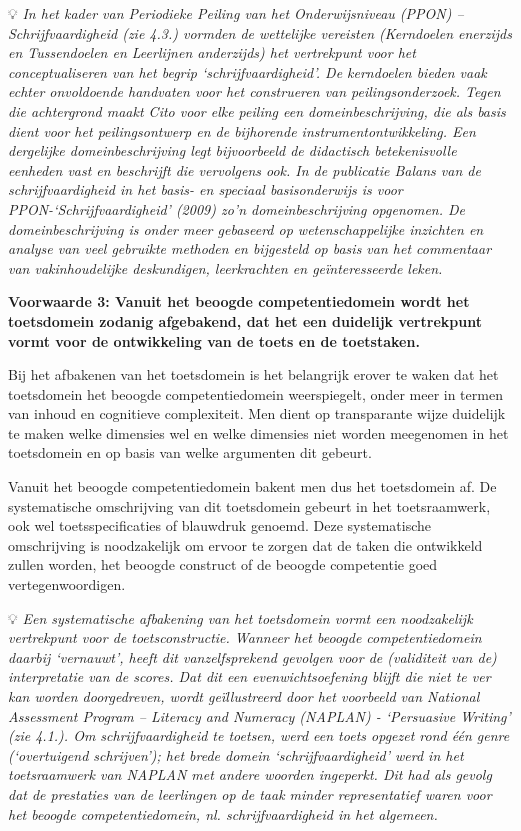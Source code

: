\documentclass[
  letterpaper,
]{report}
\begin{document}
💡 \emph{In het kader van Periodieke Peiling van het Onderwijsniveau
(PPON) -- Schrijfvaardigheid (zie 4.3.) vormden de wettelijke vereisten
(Kerndoelen enerzijds en Tussendoelen en Leerlijnen anderzijds) het
vertrekpunt voor het conceptualiseren van het begrip
`schrijfvaardigheid'. De kerndoelen bieden vaak echter onvoldoende
handvaten voor het construeren van peilingsonderzoek. Tegen die
achtergrond maakt Cito voor elke peiling een domeinbeschrijving, die als
basis dient voor het peilingsontwerp en de bijhorende
instrumentontwikkeling. Een dergelijke domeinbeschrijving legt
bijvoorbeeld de didactisch betekenisvolle eenheden vast en beschrijft
die vervolgens ook. In de publicatie Balans van de schrijfvaardigheid in
het basis- en speciaal basisonderwijs is voor PPON-`Schrijfvaardigheid'
(2009) zo'n domeinbeschrijving opgenomen. De domeinbeschrijving is onder
meer gebaseerd op wetenschappelijke inzichten en analyse van veel
gebruikte methoden en bijgesteld op basis van het commentaar van
vakinhoudelijke deskundigen, leerkrachten en geïnteresseerde leken.}

\textbf{Voorwaarde 3: Vanuit het beoogde competentiedomein wordt het
toetsdomein zodanig afgebakend, dat het een duidelijk vertrekpunt vormt
voor de ontwikkeling van de toets en de toetstaken.}

Bij het afbakenen van het toetsdomein is het belangrijk erover te waken
dat het toetsdomein het beoogde competentiedomein weerspiegelt, onder
meer in termen van inhoud en cognitieve complexiteit. Men dient op
transparante wijze duidelijk te maken welke dimensies wel en welke
dimensies niet worden meegenomen in het toetsdomein en op basis van
welke argumenten dit gebeurt.

Vanuit het beoogde competentiedomein bakent men dus het toetsdomein af.
De systematische omschrijving van dit toetsdomein gebeurt in het
toetsraamwerk, ook wel toetsspecificaties of blauwdruk genoemd. Deze
systematische omschrijving is noodzakelijk om ervoor te zorgen dat de
taken die ontwikkeld zullen worden, het beoogde construct of de beoogde
competentie goed vertegenwoordigen.

💡 \emph{Een systematische afbakening van het toetsdomein vormt een
noodzakelijk vertrekpunt voor de toetsconstructie. Wanneer het beoogde
competentiedomein daarbij `vernauwt', heeft dit vanzelfsprekend gevolgen
voor de (validiteit van de) interpretatie van de scores. Dat dit een
evenwichtsoefening blijft die niet te ver kan worden doorgedreven, wordt
geïllustreerd door het voorbeeld van National Assessment Program --
Literacy and Numeracy (NAPLAN) - `Persuasive Writing' (zie 4.1.). Om
schrijfvaardigheid te toetsen, werd een toets opgezet rond één genre
(`overtuigend schrijven'); het brede domein `schrijfvaardigheid' werd in
het toetsraamwerk van NAPLAN met andere woorden ingeperkt. Dit had als
gevolg dat de prestaties van de leerlingen op de taak minder
representatief waren voor het beoogde competentiedomein, nl.
schrijfvaardigheid in het algemeen.}
\end{document}

